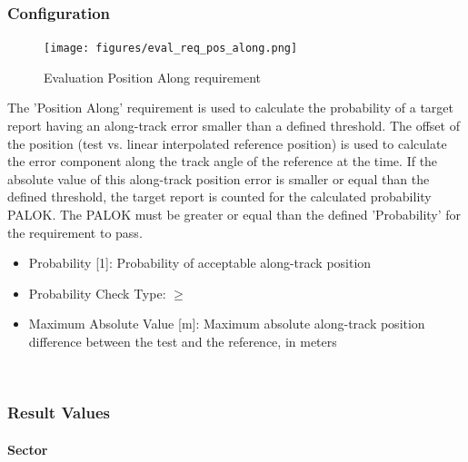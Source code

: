 \subsubsection{Configuration}

\begin{figure}[H]
    \texttt{[image: figures/eval\_req\_pos\_along.png]}
  \caption{Evaluation Position Along requirement}
\end{figure}

The 'Position Along' requirement is used to calculate the probability of a target report having an along-track error smaller than a defined threshold. The offset of the position (test vs. linear interpolated reference position) is used to calculate the error component along the track angle of the reference at the time. If the absolute value of this along-track position error is smaller or equal than the defined threshold, the target report is counted for the calculated probability PALOK. The PALOK must be greater or equal than the defined 'Probability' for the requirement to pass. \\

\begin{itemize}  
\item Probability [1]: Probability of acceptable along-track position
\item Probability Check Type: $\geq$
\item Maximum Absolute Value [m]: Maximum absolute along-track position difference between the test and the reference, in meters
\end{itemize}
\ \\

\subsubsection{Result Values}

\paragraph{Sector}

